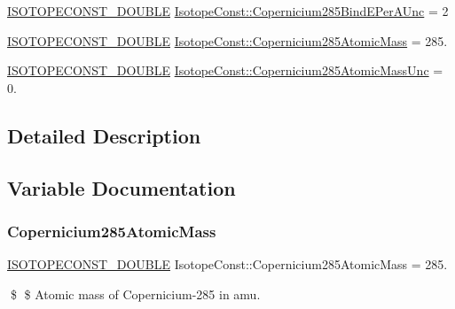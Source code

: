 \begin{DoxyCompactItemize}
\item 
\mbox{\hyperlink{group___isotope_const-_macros_ga8f45a7272ce02c0b4c65c44636ed719a}{I\+S\+O\+T\+O\+P\+E\+C\+O\+N\+S\+T\+\_\+\+D\+O\+U\+B\+LE}} \mbox{\hyperlink{group___isotope_const-_copernicium-_cn285_ga2774aee5bb2c634b5893a302f34d2bf8}{Isotope\+Const\+::\+Copernicium285\+Bind\+E\+Per\+A\+Unc}} = 2
\item 
\mbox{\hyperlink{group___isotope_const-_macros_ga8f45a7272ce02c0b4c65c44636ed719a}{I\+S\+O\+T\+O\+P\+E\+C\+O\+N\+S\+T\+\_\+\+D\+O\+U\+B\+LE}} \mbox{\hyperlink{group___isotope_const-_copernicium-_cn285_ga260d5e50cdcf29aac50ab7eedec1b030}{Isotope\+Const\+::\+Copernicium285\+Atomic\+Mass}} = 285.
\item 
\mbox{\hyperlink{group___isotope_const-_macros_ga8f45a7272ce02c0b4c65c44636ed719a}{I\+S\+O\+T\+O\+P\+E\+C\+O\+N\+S\+T\+\_\+\+D\+O\+U\+B\+LE}} \mbox{\hyperlink{group___isotope_const-_copernicium-_cn285_gab16fd85654ddda69c7a72b8a2adc6d76}{Isotope\+Const\+::\+Copernicium285\+Atomic\+Mass\+Unc}} = 0.
\end{DoxyCompactItemize}


\subsection{Detailed Description}


\subsection{Variable Documentation}
\mbox{\label{group___isotope_const-_copernicium-_cn285_ga260d5e50cdcf29aac50ab7eedec1b030}} 
\subsubsection{\texorpdfstring{Copernicium285\+Atomic\+Mass}{Copernicium285AtomicMass}}
{\footnotesize\ttfamily \mbox{\hyperlink{group___isotope_const-_macros_ga8f45a7272ce02c0b4c65c44636ed719a}{I\+S\+O\+T\+O\+P\+E\+C\+O\+N\+S\+T\+\_\+\+D\+O\+U\+B\+LE}} Isotope\+Const\+::\+Copernicium285\+Atomic\+Mass = 285.}

\$ \$ Atomic mass of Copernicium-\/285 in amu. \mbox{\label{group___isotope_const-_copernicium-_cn285_gab16fd85654ddda69c7a72b8a2adc6d76}} 
